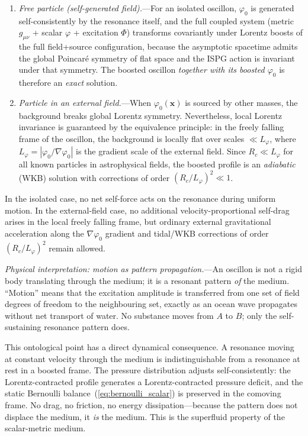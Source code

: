 \documentclass[aps,prd,onecolumn,superscriptaddress,nofootinbib,showpacs,12pt,notitlepage]{revtex4-2}
\begin{document}
\begin{enumerate}
  \item \textit{Free particle (self-generated field).}---For
    an isolated oscillon, $\varphi_{0}$ is generated
    self-consistently by the resonance itself, and the
    full coupled system (metric $g_{\mu\nu}$ + scalar
    $\varphi$ + excitation $\Phi$) transforms covariantly
    under Lorentz boosts of the full field+source
    configuration, because the asymptotic spacetime
    admits the global Poincar\'e symmetry of flat space
    and the ISPG action is invariant under that symmetry.
    The boosted oscillon \emph{together with its boosted
    $\varphi_{0}$} is therefore an \emph{exact} solution.
  \item \textit{Particle in an external field.}---When
    $\varphi_{0}(\mathbf{x})$ is sourced by other masses,
    the background breaks global Lorentz symmetry.
    Nevertheless, local Lorentz invariance is guaranteed
    by the equivalence principle: in the freely falling
    frame of the oscillon, the background is locally flat
    over scales $\ll L_{\varphi}$, where
    $L_{\varphi} = |\varphi_{0}/\nabla\varphi_{0}|$ is
    the gradient scale of the external field.  Since
    $R_{c} \ll L_{\varphi}$ for all known particles in
    astrophysical fields, the boosted profile is an
    \emph{adiabatic} (WKB) solution with corrections of
    order $(R_{c}/L_{\varphi})^{2} \ll 1$.
\end{enumerate}

In the isolated case, no net self-force acts on the
resonance during uniform motion.  In the external-field
case, no additional velocity-proportional self-drag
arises in the local freely falling frame, but ordinary
external gravitational acceleration along the
$\nabla\varphi_{0}$ gradient and tidal/WKB corrections of
order $(R_c/L_\varphi)^2$ remain allowed.

\textit{Physical interpretation: motion as pattern
propagation.}---An oscillon is not a rigid body
translating through the medium; it is a resonant
pattern \emph{of} the medium.  ``Motion'' means that
the excitation amplitude is transferred from one set
of field degrees of freedom to the neighbouring set,
exactly as an ocean wave propagates without net
transport of water.  No substance moves from $A$ to
$B$; only the self-sustaining resonance pattern does.

This ontological point has a direct dynamical
consequence.  A resonance moving at constant velocity
through the medium is indistinguishable
from a resonance at rest in a boosted frame.  The
pressure distribution adjusts self-consistently:
the Lorentz-contracted profile generates a
Lorentz-contracted pressure deficit, and the static
Bernoulli balance~(\ref{eq:bernoulli_scalar}) is
preserved in the comoving frame.  No drag, no friction,
no energy dissipation---because the pattern does not
displace the medium, it \emph{is} the medium.  This is
the superfluid property of the scalar-metric medium.
\end{document}

